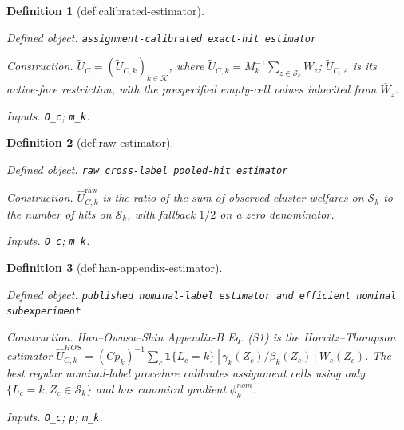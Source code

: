 \documentclass{article}
\newtheorem{definition}{Definition}
\begin{document}
\begin{definition}[def:calibrated-estimator]\label{def:calibrated-estimator}
\par\smallskip\noindent\emph{Defined object.} \texttt{assignment-\allowbreak{}calibrated exact-\allowbreak{}hit estimator}
\par\smallskip\noindent\emph{Construction.} \(\widetilde U_C=(\widetilde U_{C,k})_{k\in\mathcal K}\), where \(\widetilde U_{C,k}=M_k^{-1}\sum_{z\in\mathcal S_k}\overline W_z\); \(\widetilde U_{C,A}\) is its active-face restriction, with the prespecified empty-cell values inherited from \(\overline W_z\).
\par\smallskip\noindent\emph{Inputs.} \texttt{O\_\allowbreak{}c}; \texttt{m\_\allowbreak{}k}.
\end{definition}

\begin{definition}[def:raw-estimator]\label{def:raw-estimator}
\par\smallskip\noindent\emph{Defined object.} \texttt{raw cross-\allowbreak{}label pooled-\allowbreak{}hit estimator}
\par\smallskip\noindent\emph{Construction.} \(\widehat U^{\mathrm{raw}}_{C,k}\) is the ratio of the sum of observed cluster welfares on \(\mathcal S_k\) to the number of hits on \(\mathcal S_k\), with fallback \(1/2\) on a zero denominator.
\par\smallskip\noindent\emph{Inputs.} \texttt{O\_\allowbreak{}c}; \texttt{m\_\allowbreak{}k}.
\end{definition}

\begin{definition}[def:han-appendix-estimator]\label{def:han-appendix-estimator}
\par\smallskip\noindent\emph{Defined object.} \texttt{published nominal-\allowbreak{}label estimator and efficient nominal subexperiment}
\par\smallskip\noindent\emph{Construction.} Han--Owusu--Shin Appendix-B Eq. (S1) is the Horvitz--Thompson estimator \(\widehat U^{HOS}_{C,k}=(Cp_k)^{-1}\sum_c\mathbf 1\{L_c=k\}[\gamma_k(Z_c)/\beta_k(Z_c)]W_c(Z_c)\). The best regular nominal-label procedure calibrates assignment cells using only \(\{L_c=k,Z_c\in\mathcal S_k\}\) and has canonical gradient \(\phi_k^{nom}\).
\par\smallskip\noindent\emph{Inputs.} \texttt{O\_\allowbreak{}c}; \texttt{p}; \texttt{m\_\allowbreak{}k}.
\end{definition}
\end{document}
